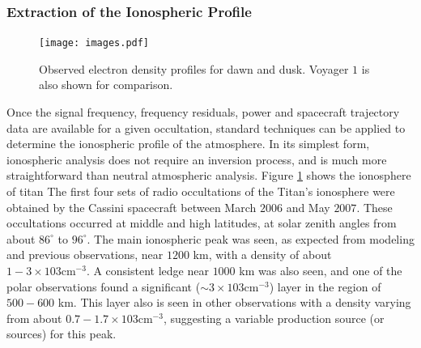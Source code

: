 \documentclass[oneside]{book}
\theoremstyle{mystyle}
\begin{document}
\subsubsection{\footnotesize Extraction of the Ionospheric Profile}
%
\begin{figure}
	\centering
    \vspace{-5ex}
	\texttt{[image: images.pdf]}
	\caption[Observed Electron Density Profile of Titan]{Observed electron density profiles for dawn and dusk. Voyager $1$ is also shown for comparison.}
	\label{fig:atmo_ionosphere_kliore_et_al}
\end{figure}
%
Once the signal frequency, frequency residuals, power and spacecraft trajectory data are available for a given occultation, standard techniques can be applied to determine the ionospheric profile of the atmosphere. In its simplest form, ionospheric analysis does not require an inversion process, and is much more straightforward than neutral atmospheric analysis. Figure \ref{fig:atmo_ionosphere_kliore_et_al} shows the ionosphere of \gls{titan} The first four sets of radio occultations of the Titan's ionosphere were obtained by the Cassini spacecraft between March $2006$ and May $2007$. These occultations occurred at middle and high latitudes, at solar zenith angles from about $86^{\circ}$ to $96^{\circ}$. The main ionospheric peak was seen, as expected from modeling and previous observations, near $1200$ km, with a density of about $1-3 \times 103 \textrm{cm}^{-3}$. A consistent ledge near $1000$ km was also seen, and one of the polar observations found a significant ($\sim 3 \times 103 \textrm{cm}^{-3}$) layer in the region of $500-600$ km. This layer also is seen in other observations with a density varying from about $0.7 - 1.7 \times 103 \textrm{cm}^{-3}$, suggesting a variable production source (or sources) for this peak.
\end{document}
